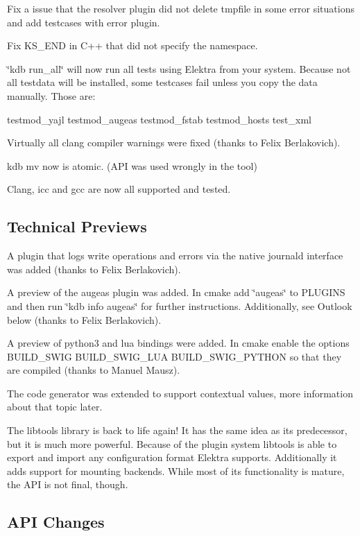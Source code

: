 Fix a issue that the resolver plugin did not delete tmpfile in some error situations and add testcases with error plugin.

Fix K\+S\+\_\+\+E\+ND in C++ that did not specify the namespace.

\char`\"{}kdb run\+\_\+all\char`\"{} will now run all tests using Elektra from your system. Because not all testdata will be installed, some testcases fail unless you copy the data manually. Those are\+: \begin{DoxyVerb}testmod_yajl testmod_augeas testmod_fstab testmod_hosts test_xml
\end{DoxyVerb}


Virtually all clang compiler warnings were fixed (thanks to Felix Berlakovich).

kdb mv now is atomic. (A\+PI was used wrongly in the tool)

Clang, icc and gcc are now all supported and tested.

\subsection*{Technical Previews}

A plugin that logs write operations and errors via the native journald interface was added (thanks to Felix Berlakovich).

A preview of the augeas plugin was added. In cmake add \char`\"{}augeas\char`\"{} to P\+L\+U\+G\+I\+NS and then run \char`\"{}kdb info augeas\char`\"{} for further instructions. Additionally, see Outlook below (thanks to Felix Berlakovich).

A preview of python3 and lua bindings were added. In cmake enable the options {\ttfamily B\+U\+I\+L\+D\+\_\+\+S\+W\+IG B\+U\+I\+L\+D\+\_\+\+S\+W\+I\+G\+\_\+\+L\+UA B\+U\+I\+L\+D\+\_\+\+S\+W\+I\+G\+\_\+\+P\+Y\+T\+H\+ON} so that they are compiled (thanks to Manuel Mausz).

The code generator was extended to support contextual values, more information about that topic later.

The libtools library is back to life again! It has the same idea as its predecessor, but it is much more powerful. Because of the plugin system libtools is able to export and import any configuration format Elektra supports. Additionally it adds support for mounting backends. While most of its functionality is mature, the A\+PI is not final, though.

\subsection*{A\+PI Changes}


